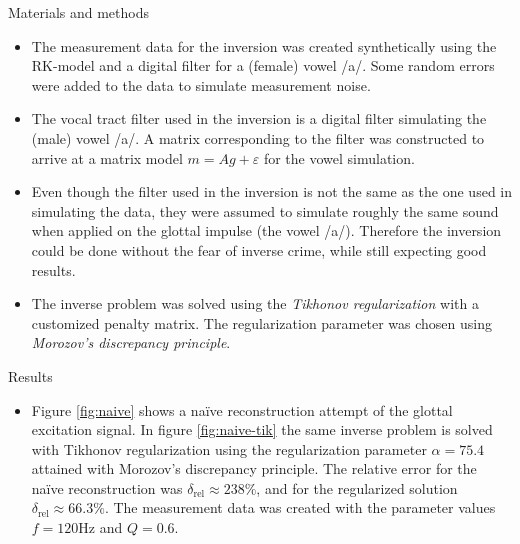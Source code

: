 \documentclass[final]{beamer}
\newcommand{\eps}{\ensuremath{\varepsilon}}
\begin{document}
\begin{frame}[t]
\begin{columns}[t]
\begin{column}{.465\textwidth}
\begin{block}{Materials and methods}
\begin{itemize}
\item The measurement data for the inversion was created synthetically using the RK-model and a digital filter for a (female) vowel /a/. Some random errors were added to the data to simulate measurement noise.

\item The vocal tract filter used in the inversion is a digital filter simulating the (male) vowel /a/. A matrix corresponding to the filter was constructed to arrive at a matrix model $m = A g + \eps$ for the vowel simulation.

\item Even though the filter used in the inversion is not the same as the one used in simulating the data, they were assumed to simulate roughly the same sound when applied on the glottal impulse (the vowel /a/). Therefore the inversion could be done without the fear of inverse crime, while still expecting good results.

\item The inverse problem was solved using the \emph{Tikhonov regularization} with a customized penalty matrix. The regularization parameter was chosen using \emph{Morozov's discrepancy principle}.

\end{itemize}

\end{block}




\begin{block}{Results}

\begin{itemize}

\item Figure \ref{fig:naive} shows a naïve reconstruction attempt of the glottal excitation signal. In figure \ref{fig:naive-tik} the same inverse problem is solved with Tikhonov regularization using the regularization parameter $\alpha = 75.4$ attained with Morozov's discrepancy principle. The relative error for the naïve reconstruction was $\delta_{\text{rel}} \approx 238 \%$, and for the regularized solution $\delta_{\text{rel}} \approx 66.3 \%$. The measurement data was created with the parameter values $f = 120 \text{Hz}$ and $Q = 0.6$.


\end{itemize}
\end{block}
\end{column}
\end{columns}
\end{frame}
\end{document}
